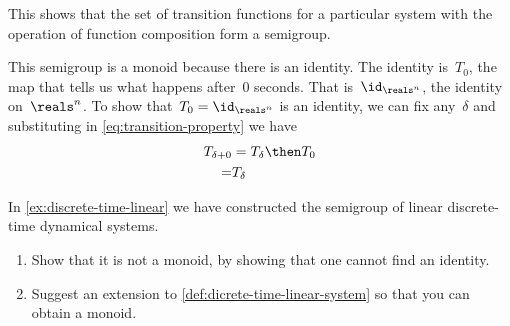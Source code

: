 \begin{example}
  This shows that the set of transition functions for a particular system with the operation of function composition form a semigroup.

  This semigroup is a monoid because there is an identity. The identity is~$T_0$, the map that tells us
  what happens after~$0$ seconds. That is~$\id_{\reals^n}$, the identity on~$\reals^n$.
  To show that~$T_0 = \id_{\reals^n}$ is an identity, we can fix any~$\delta$ and substituting in \cref{eq:transition-property} we have
  \begin{equation*}
    \begin{aligned}
      T_{\delta + 0}&= T_{\delta} \then T_{0} \\
      = & T_{\delta}
    \end{aligned}
  \end{equation*}

\end{example}


\begin{exercise}
  In \cref{ex:discrete-time-linear} we have constructed the semigroup of linear discrete-time dynamical systems.

  \begin{enumerate}
    \item Show that it is not a monoid, by showing that one cannot find an identity.
    \item Suggest an extension to \cref{def:dicrete-time-linear-system} so that you can obtain a monoid.
  \end{enumerate}
\end{exercise}
\begin{solution}
\end{solution}

